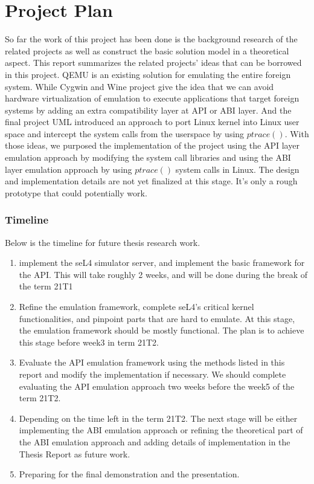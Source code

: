\chapter{Project Plan}\label{ch:projplan}

So far the work of this project has been done is the background research of the related projects as well as construct the basic solution model in a theoretical aspect. This report summarizes the related projects' ideas that can be borrowed in this project. QEMU is an existing solution for emulating the entire foreign system. While Cygwin and Wine project give the idea that we can avoid hardware virtualization of emulation to execute applications that target foreign systems by adding an extra compatibility layer at API or ABI layer. And the final project UML introduced an approach to port Linux kernel into Linux user space and intercept the system calls from the userspace by using $ptrace()$. With those ideas, we purposed the implementation of the project using the API layer emulation approach by modifying the system call libraries and using the ABI layer emulation approach by using $ptrace()$ system calls in Linux. The design and implementation details are not yet finalized at this stage. It's only a rough prototype that could potentially work. 

\subsection{Timeline}
Below is the timeline for future thesis research work.

\begin{enumerate}
    \item implement the seL4 simulator server, and implement the basic framework for the API. This will take roughly 2 weeks, and will be done during the break of the term 21T1
    \item Refine the emulation framework, complete seL4's critical kernel functionalities, and pinpoint parts that are hard to emulate. At this stage, the emulation framework should be mostly functional. The plan is to achieve this stage before week3 in term 21T2.
    \item Evaluate the API emulation framework using the methods listed in this report and modify the implementation if necessary. We should complete evaluating the API emulation approach two weeks before the week5 of the term 21T2.
    \item Depending on the time left in the term 21T2. The next stage will be either implementing the ABI emulation approach or refining the theoretical part of the ABI emulation approach and adding details of implementation in the Thesis Report as future work.
    \item Preparing for the final demonstration and the presentation.
\end{enumerate}